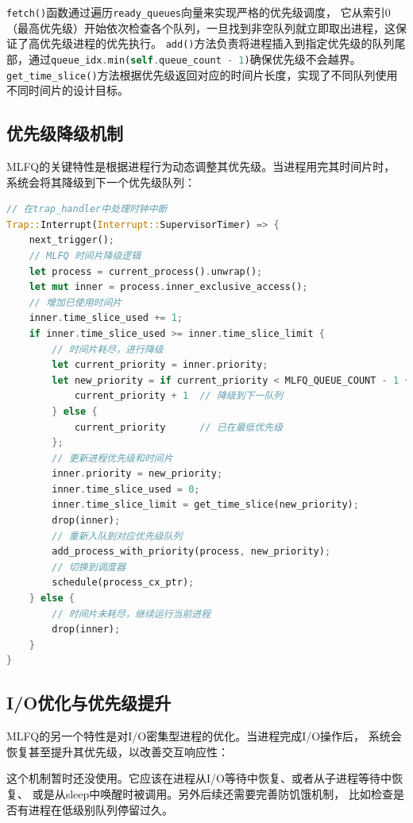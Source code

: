 \lstinline[language=Rust]{fetch()}函数通过遍历\lstinline[language=Rust]{ready_queues}向量来实现严格的优先级调度，
它从索引0（最高优先级）开始依次检查各个队列，一旦找到非空队列就立即取出进程，这保证了高优先级进程的优先执行。
\lstinline[language=Rust]{add()}方法负责将进程插入到指定优先级的队列尾部，通过\lstinline[language=Rust]{queue_idx.min(self.queue_count - 1)}确保优先级不会越界。
\lstinline[language=Rust]{get_time_slice()}方法根据优先级返回对应的时间片长度，实现了不同队列使用不同时间片的设计目标。

\subsection{优先级降级机制}

MLFQ的关键特性是根据进程行为动态调整其优先级。当进程用完其时间片时，
系统会将其降级到下一个优先级队列：

\begin{lstlisting}[language=Rust,caption={MLFQ时间片处理和降级}, label={lst:mlfq-downgrade}]
// 在trap_handler中处理时钟中断
Trap::Interrupt(Interrupt::SupervisorTimer) => {
    next_trigger();
    // MLFQ 时间片降级逻辑
    let process = current_process().unwrap();
    let mut inner = process.inner_exclusive_access();
    // 增加已使用时间片
    inner.time_slice_used += 1;
    if inner.time_slice_used >= inner.time_slice_limit {
        // 时间片耗尽，进行降级
        let current_priority = inner.priority;
        let new_priority = if current_priority < MLFQ_QUEUE_COUNT - 1 {
            current_priority + 1  // 降级到下一队列
        } else {
            current_priority      // 已在最低优先级
        };
        // 更新进程优先级和时间片
        inner.priority = new_priority;
        inner.time_slice_used = 0;
        inner.time_slice_limit = get_time_slice(new_priority);
        drop(inner);
        // 重新入队到对应优先级队列
        add_process_with_priority(process, new_priority);
        // 切换到调度器
        schedule(process_cx_ptr);
    } else {
        // 时间片未耗尽，继续运行当前进程
        drop(inner);
    }
}
\end{lstlisting}

\subsection{I/O优化与优先级提升}

MLFQ的另一个特性是对I/O密集型进程的优化。当进程完成I/O操作后，
系统会恢复甚至提升其优先级，以改善交互响应性：

这个机制暂时还没使用。它应该在进程从I/O等待中恢复、或者从子进程等待中恢复、
或是从sleep中唤醒时被调用。另外后续还需要完善防饥饿机制，
比如检查是否有进程在低级别队列停留过久。

